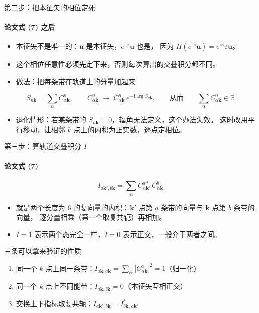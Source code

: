 \documentclass[aspectratio=169,11pt]{ctexbeamer}
\newcommand{\eps}{\varepsilon}
\newcommand{\kk}{\mathbf{k}}
\newcommand{\kq}{\mathbf{k}'}
\begin{document}
\begin{frame}{第二步：把本征矢的相位定死}
  \framesubtitle{论文式 (7) 之后}
  \begin{itemize}
    \item 本征矢不是唯一的：$\mathbf u$ 是本征矢，$e^{\mathrm{i}\varphi}\mathbf u$ 也是，
          因为 $H(e^{\mathrm{i}\varphi}\mathbf u)=e^{\mathrm{i}\varphi}\eps\mathbf u$。
    \item 这个相位任意性必须先定下来，否则每次算出的交叠积分都不同。
    \item 做法：把每条带在轨道上的分量加起来
  \end{itemize}
  \begin{equation*}
    S_{n\kk}=\sum_{\alpha}C^{n}_{\alpha\kk},
    \qquad
    C^{n}_{\alpha\kk}\;\longrightarrow\;C^{n}_{\alpha\kk}\,e^{-\mathrm{i}\arg S_{n\kk}},
    \qquad\text{从而}\qquad
    \sum_{\alpha}C^{n}_{\alpha\kk}\in\mathbb{R}
  \end{equation*}
  \begin{itemize}
    \item 退化情形：若某条带的 $S_{n\kk}=0$，辐角无法定义，这个办法失效。
          这时改用平行移动，让相邻 $k$ 点上的内积为正实数，逐点定相位。
  \end{itemize}
\end{frame}


\begin{frame}{第三步：算轨道交叠积分 $I$}
  \framesubtitle{论文式 (7)}
  \begin{equation*}
    I_{a\kq,b\kk}=\sum_{\alpha}C^{a*}_{\alpha\kq}\,C^{b}_{\alpha\kk}
  \end{equation*}
  \begin{itemize}
    \item 就是两个长度为 6 的复向量的内积：$\kq$ 点第 $a$ 条带的向量与 $\kk$ 点第 $b$ 条带的向量，
          逐分量相乘（第一个取复共轭）再相加。
    \item $I=1$ 表示两个态完全一样，$I=0$ 表示正交，一般介于两者之间。
  \end{itemize}
  \vspace{2mm}
  \begin{block}{三条可以拿来验证的性质}
    \begin{enumerate}
      \item 同一个 $k$ 点上同一条带：$I_{a\kk,a\kk}=\sum_\alpha|C^{a}_{\alpha\kk}|^2=1$（归一化）
      \item 同一个 $k$ 点上不同能带：$I_{a\kk,b\kk}=0$（本征矢互相正交）
      \item 交换上下指标取复共轭：$I_{a\kq,b\kk}=I^{*}_{b\kk,a\kq}$
    \end{enumerate}
  \end{block}
\end{frame}
\end{document}
